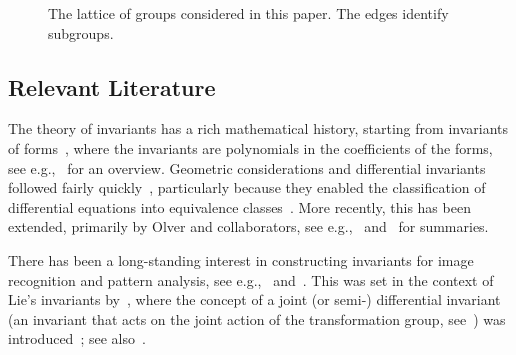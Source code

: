\documentclass{artjlt}
\begin{document}
\begin{figure}
\begin{center}
\end{center}
\caption{The lattice of groups considered in this paper. The edges identify subgroups.}
\label{fig:lattice}
\end{figure}


\subsection{Relevant Literature}

The theory of invariants has a rich mathematical history, starting from invariants of forms~\citep{Cayley}, where the invariants are polynomials in the coefficients of the forms, see e.g.,~\citet{OlverCIT,Kraft2002} for an overview. Geometric considerations and differential invariants followed fairly quickly~\citep{Veblen1872,Tresse1894,Bouton1898,Patterson1928}, particularly because they enabled the classification of differential equations into equivalence classes~\citep{Lie1884,Littlewood44, Cartan52}. More recently, this has been extended, primarily by Olver and collaborators, see e.g.,~\citet{OlverCIT} and~\citet{OlverEIS} for summaries.

There has been a long-standing interest in constructing invariants for image recognition and pattern analysis, see e.g.,~\citet{Mundy1992} and~\citet{Wood1996}. This was set in the context of Lie's invariants by~\citet{VanGool1995}, where the concept of a joint (or semi-) differential invariant (an invariant that acts on the joint action of the transformation group, see~\citet{Fels1997,Olver2013}) was introduced~\citep{VanGool1992}; see also~\citet{Hubert2009}. 
\end{document}

